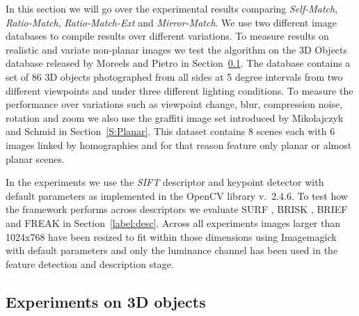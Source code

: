 \documentclass[journal]{IEEEtran}
\begin{document}
In this section we will go over the experimental results comparing 
\emph{Self-Match}, \emph{Ratio-Match}, \emph{Ratio-Match-Ext} and 
\emph{Mirror-Match}. We use two different image databases to compile 
results over different variations.  To measure results on realistic and 
variate non-planar images we test the algorithm on the 3D Objects 
database released by Moreels and Pietro \cite{moreels2007evaluation} in 
Section~\ref{S:3dobjects}. The database contains a set of 86 3D objects 
photographed from all sides at 5 degree intervals from two different 
viewpoints and under three different lighting conditions.
To measure the performance over variations such as viewpoint change, 
blur, compression noise, rotation and zoom we also use the graffiti 
image set introduced by Mikolajczyk and Schmid 
\cite{mikolajczyk2005performance} in Section~\ref{S:Planar}.  This 
dataset contains 8 scenes each with 6 images linked by homographies and 
for that reason feature only planar or almost planar scenes.

In the experiments we use the \emph{SIFT} descriptor and keypoint 
detector with default parameters as implemented in the OpenCV library 
v.\ 2.4.6.  To test how the framework performs across descriptors we 
evaluate SURF \cite{bay2006surf}, BRISK \cite{leutenegger2011brisk}, 
BRIEF \cite{calonder2010brief} and FREAK \cite{alahi2012freak} in 
Section~\ref{label:desc}. Across all experiments images larger than 
1024x768 have been resized to fit within those dimensions using 
Imagemagick with default parameters and only the luminance channel has 
been used in the feature detection and description stage.

\subsection{Experiments on 3D objects}
\label{S:3dobjects}
\end{document}
